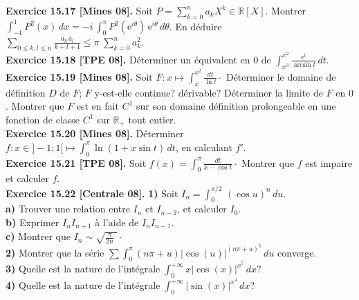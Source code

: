 \documentclass[a4paper,12pt,francais]{article}
\newcommand{\field}[1]{\mathbb{#1}}
\newcommand{\R}{\field{R}}
\newcommand{\e}{\mbox{e}}
\begin{document}
\noindent
{\bf Exercice 15.17 [Mines 08].} Soit $P=\displaystyle \sum_{k=0}^n a_k X^k \in \R[X]$. Montrer $\displaystyle \int_{-1}^1 P^2(x) \, dx = -i \, \int_0^{\pi} P^2(\e^{i\theta}) \, \e^{i\theta}\, d\theta$. 
En déduire $\displaystyle \sum_{0\leqslant k,l \leqslant n} \frac{a_k\, a_l}{k+l+1} \leqslant \pi \; \sum_{k=0}^n a_k^2$.\\

\noindent
{\bf Exercice 15.18 [TPE 08].} Déterminer un équivalent en $0$ de $\displaystyle \int_{x^3}^{x^2} \frac{\e^t}{\arcsin t}\, dt.$\\

\noindent
{\bf Exercice 15.19 [Mines 08].} 
Soit $F: x\mapsto \int_x^{x^2}\frac{dt}{\ln t} \cdot$ Déterminer le domaine de définition $D$ de $F$; $F$ y-est-elle continue? dérivable? Déterminer la limite de $F$ en $0$. Montrer que $F$ est en fait $C^1$ sur son domaine définition prolongeable en une fonction de classe $C^1$ sur $\R_+$ tout entier.\\ %

\noindent
{\bf Exercice 15.20 [Mines 08].} Déterminer $\displaystyle  f:x \in ]-1;1[ \mapsto \int_0^{\pi} \ln (1+x \sin t) \, dt$, en calculant $f'$.\\

\noindent
{\bf Exercice 15.21 [TPE 08].} Soit $\displaystyle f(x)=\int_0^{\pi} \frac{dt}{x-\cos t} \cdot$ Montrer que $f$ est impaire et calculer $f$.\\ 

\noindent
{\bf Exercice 15.22 [Centrale 08].} {\bf 1)} Soit $I_n=\int_0^{\pi/2} \, (\cos u)^n \, du$.\\
\indent
{\bf a)} Trouver une relation entre $I_n$ et $I_{n-2}$, et calculer $I_0$.\\
\indent
{\bf b)} Exprimer $I_n I_{n+1}$ à l'aide de $I_n I_{n-1}.$\\
\indent
{\bf c)} Montrer que $I_n\sim \sqrt{\frac{\pi}{2n} \; }\cdot$\\
{\bf 2)} Montrer que la série $\displaystyle \sum \int_0^{\pi} (n\pi+u)|\cos (u) |^{(n\pi+u)^5} \, du$ converge.\\
{\bf 3)} Quelle est la nature de l'intégrale $\displaystyle \int_0^{+\infty} x|\cos(x)|^{x^5} \, dx$?\\
{\bf 4)} Quelle est la nature de l'intégrale $\displaystyle \int_0^{+\infty} |\sin(x)|^{x^4} \, dx$?\\
\end{document}

